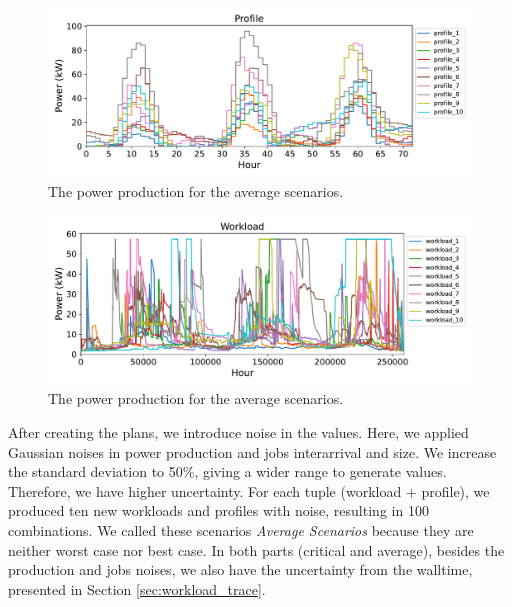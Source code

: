 \begin{figure}[!htb]
    \centering
    \includegraphics[scale=0.58]{Images/Compensations/diff_power_production.pdf}
    \caption{The power production for the average scenarios.}
    \label{fig:average_weather_with_noise}
\end{figure}

\begin{figure}[!htb]
    \centering
    \includegraphics[scale=0.58]{Images/Compensations/diff_jobs_arriving.pdf}
    \caption{The power production for the average scenarios.}
    \label{fig:average_workload_with_noise}
\end{figure}

After creating the plans, we introduce noise in the values. Here, we applied Gaussian noises in power production and jobs interarrival and size. We increase the standard deviation to 50\%, giving a wider range to generate values. Therefore, we have higher uncertainty. For each tuple (workload + profile), we produced ten new workloads and profiles with noise, resulting in 100 combinations. We called these scenarios \emph{Average Scenarios} because they are neither worst case nor best case. In both parts (critical and average), besides the production and jobs noises, we also have the uncertainty from the walltime, presented in Section \ref{sec:workload_trace}.


